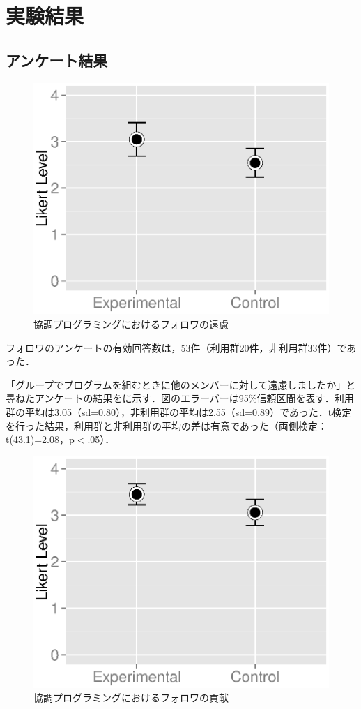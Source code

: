\chapter{実験結果}\label{RS}


\section{アンケート結果}

\begin{figure}[h]
	\begin{center}
		\includegraphics[width=0.75\linewidth]{img/diffidence.eps}
		\caption{協調プログラミングにおけるフォロワの遠慮}
		\label{fig:Diffidence}
	\end{center}
\end{figure}

フォロワのアンケートの有効回答数は，53件（利用群20件，非利用群33件）であった．

「グループでプログラムを組むときに他のメンバーに対して遠慮しましたか」と尋ねたアンケートの結果をに示す．図のエラーバーは95\%信頼区間を表す．利用群の平均は3.05（sd=0.80），非利用群の平均は2.55（sd=0.89）であった．t検定を行った結果，利用群と非利用群の平均の差は有意であった（両側検定：t(43.1)=2.08，p$<$.05）．

\begin{figure}[h]
	\begin{center}
		\includegraphics[width=0.75\linewidth]{img/contribution.eps}
		\caption{協調プログラミングにおけるフォロワの貢献}
		\label{fig:Contribution}
	\end{center}
\end{figure}

